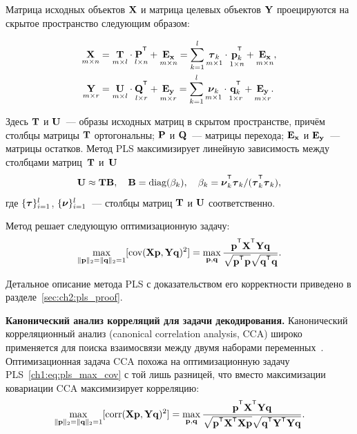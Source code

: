 \documentclass[11pt, a5paper]{dissert}
\begin{document}
Матрица исходных объектов $\mathbf{X}$ и матрица целевых объектов $\mathbf{Y}$ проецируются на скрытое пространство следующим образом:

\begin{align}
	\label{ch1:eq:PLS_X}
	\underset{m \times n}{\bX} 
	&= \underset{m \times l}{\bT} \cdot \underset{l \times n}{\bP^{\T}} + \underset{m \times n}{\bE_{\bx}} 
	= \sum_{k=1}^l \underset{m \times 1}{\btau_k} \cdot \underset{1 \times n}{\bp_k^{\T}} + \underset{m \times n}{\bE_{\bx}},\\
	\label{ch1:eq:PLS_Y}
	\underset{m \times r}{\bY} 
	&= \underset{m \times l}{\bU} \cdot \underset{l \times r}{\bQ^{\T}} + \underset{m \times r}{\bE_{\by}}
	=  \sum_{k=1}^l  \underset{m \times 1}{\bnu_k} \cdot \underset{1 \times r}{\bq_k^{\T}} +  \underset{m \times r}{\bE_{\by}}.
\end{align}

Здесь $\mathbf{T}$ и $\mathbf{U}$~--- образы исходных матриц в скрытом пространстве, причём столбцы матрицы $\mathbf{T}$ ортогональны; $\mathbf{P}$ и $\mathbf{Q}$~--- матрицы перехода; $\mathbf{E}_{\mathbf{x}}$ и $\mathbf{E}_{\mathbf{y}}$~--- матрицы остатков. 
Метод PLS максимизирует линейную зависимость между столбцами матриц~$\mathbf{T}$ и~$\mathbf{U}$
\begin{equation*}
	\bU \approx \bT \bB, \quad \bB = \text{diag}(\beta_k), \quad \beta_k = \bnu_k^{\T}\btau_k / (\btau_k^{\T}\btau_k),
\end{equation*}
где $\{\boldsymbol{\tau}\}_{i=1}^l$, $\{\boldsymbol{\nu}\}_{i=1}^l$~--- столбцы матриц $\mathbf{T}$ и $\mathbf{U}$ соответственно.

Метод решает следующую оптимизационную задачу:
\begin{equation}
	\max_{\|\bp\|_{2}=\|\bq\|_{2}=1}[ \text{cov}(\bX \bp, \bY \bq)^{2}] = \max_{\bp, \bq} \frac{\bp^{\T} \bX^{\T} \bY \bq}{\sqrt{\bp^{\T} \bp} \sqrt{\bq^{\T} \bq}}.
	\label{ch1:eq:pls_max_cov}
\end{equation}

Детальное описание метода PLS с доказательством его корректности приведено в разделе~\ref{sec:ch2:pls_proof}.

\vspace{0.5cm}
\textbf{Канонический анализ корреляций для задачи декодирования.}
Канонический корреляционный анализ (canonical correlation analysis, CCA) широко применяется для поиска взаимосвязи между двумя наборами переменных~\cite{hotelling1992relations,anderson1962introduction}. 
Оптимизационная задача CCA похожа на оптимизационную задачу PLS~\eqref{ch1:eq:pls_max_cov} с той лишь разницей, что вместо максимизации ковариации CCA максимизирует корреляцию:
\begin{equation}
	\max_{\|\bp\|_{2}=\|\bq\|_{2}=1}[ \text{corr}(\bX \bp, \bY \bq)^{2}] = \max_{\bp, \bq} \frac{\bp^{\T} \bX^{\T} \bY \bq}{\sqrt{\bp^{\T} \bX^{\T}  \bX \bp} \sqrt{\bq^{\T} \bY^{\T}  \bY\bq}}.
	\label{ch1:eq:cca_max_corr}
\end{equation}
\end{document}
